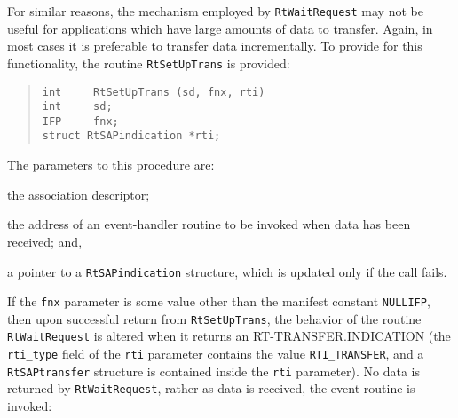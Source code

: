 For similar reasons,
the mechanism employed by \verb"RtWaitRequest" may not be useful for
applications which have large amounts of data to transfer.
Again,
in most cases it is preferable to transfer data incrementally.
To provide for this functionality,
the routine \verb"RtSetUpTrans" is provided:
\begin{quote}\small\begin{verbatim}
int     RtSetUpTrans (sd, fnx, rti)
int     sd;
IFP     fnx;
struct RtSAPindication *rti;
\end{verbatim}\end{quote}
The parameters to this procedure are:
\begin{describe}
\item[\verb"sd":] the association descriptor;

\item[\verb"fnx":] the address of an event-handler routine to be invoked when
data has been received; and,

\item[\verb"rti":] a pointer to a \verb"RtSAPindication" structure, which is
updated only if the call fails.
\end{describe}
If the \verb"fnx" parameter is some value other than the manifest constant
\verb"NULLIFP",
then upon successful return from \verb"RtSetUpTrans",
the behavior of the routine \verb"RtWaitRequest" is altered when it returns an
{\sf RT-TRANSFER.INDICATION\/}
(the \verb"rti_type" field of the \verb"rti" parameter contains the value
\verb"RTI_TRANSFER",
and a \verb"RtSAPtransfer" structure is contained inside the \verb"rti"
parameter).
No data is returned by \verb"RtWaitRequest",
rather as data is received, the event routine is invoked:
